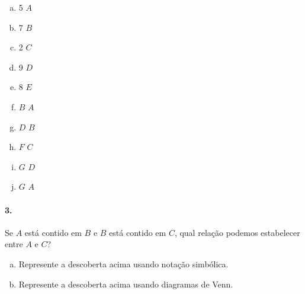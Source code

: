 \documentclass[a4paper,twocolumn,12pt]{article}
\begin{document}
\begin{minipage}[t]{0.4\columnwidth}
  
\begin{enumerate}[a)]
  \item 5 \complete $A$
  \item 7 \complete $B$
  \item 2 \complete $C$
  \item 9 \complete $D$
  \item 8 \complete $E$
  \end{enumerate}
  
\end{minipage}\hfil\begin{minipage}[t]{0.3\columnwidth}

\begin{enumerate}[a)]
  \setcounter{enumi}{5}
  \item $B$ \complete $A$
  \item $D$ \complete $B$
  \item $F$ \complete $C$
  \item $G$ \complete $D$
  \item $G$ \complete $A$
  \end{enumerate}
  
\end{minipage}

\newpage

\paragraph*{3.} Se \(A\) está contido em \(B\) e \(B\) está contido em \(C\), qual
  relação podemos estabelecer entre \(A\) e \(C\)?

  \begin{enumerate}[a)]
  \item  Represente a descoberta acima usando notação simbólica.
  \item  Represente a descoberta acima usando diagramas de Venn.
  \end{enumerate}
 

\vspace*{\fill}
\end{document}
